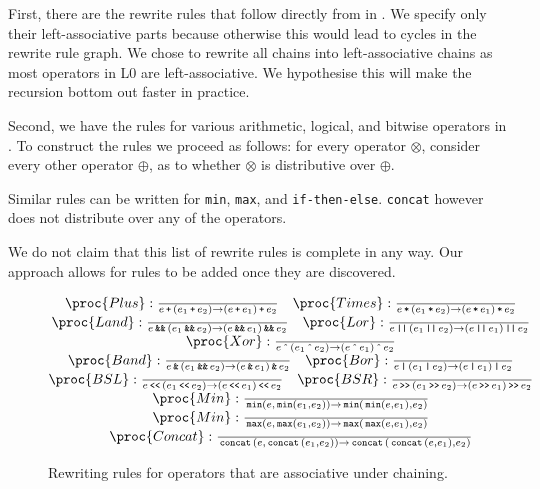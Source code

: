 First, there are the rewrite rules that follow directly from
 in . We specify
only their left-associative parts because otherwise this would lead to cycles
in the rewrite rule graph. We chose to rewrite all chains into left-associative
chains as most operators in L0 are left-associative. We hypothesise this will
make the recursion bottom out faster in practice.

Second, we have the rules for various arithmetic, logical, and bitwise
operators in . To construct the rules we proceed as
follows: for every operator $\otimes$, consider every other operator $\oplus$,
as to whether $\otimes$ is distributive over $\oplus$.

Similar rules can be written for \texttt{min}, \texttt{max}, and
\texttt{if-then-else}. \texttt{concat} however does not distribute over any of
the operators.


We do not claim that this list of rewrite rules is complete in any way. Our
approach allows for rules to be added once they are discovered.

\begin{figure*}[htbp!]
\[
\begin{matrix}
\proc{Plus}:{\over
e \lp \p{e_1 \lp e_2} \rightarrow \p{ e \lp e_1} \lp e_2
}\quad
\proc{Times}:{\over
e \lt \p{e_1\lt e_2} \rightarrow \p{e \lt e_1} \lt e_2
}\\
\proc{Land}:{\over
e \LAND \p{e_1 \LAND e_2} \rightarrow \p{ e \LAND e_1} \LAND e_2
}\quad
\proc{Lor}:{\over
e \LOR \p{e_1\LOR e_2} \rightarrow \p{e \LOR e_1} \LOR e_2
}\\
\proc{Xor}:{\over
e \LBXOR \p{e_1 \LBXOR e_2} \rightarrow \p{ e \LBXOR e_1} \LBXOR e_2
}\\
\proc{Band}:{\over
e \LBAND \p{e_1 \LAND e_2} \rightarrow \p{ e \LBAND e_1} \LBAND e_2
}\quad
\proc{Bor}:{\over
e \LBOR \p{e_1\LBOR e_2} \rightarrow \p{e \LBOR e_1} \LBOR e_2
}\\
\proc{BSL}:{\over
e \LBSL \p{e_1 \LBSL e_2} \rightarrow \p{ e \LBSL e_1} \LBSL e_2
}\quad
\proc{BSR}:{\over
e \LBSR \p{e_1\LBSR e_2} \rightarrow \p{e \LBSR e_1} \LBSR e_2
}\\
\proc{Min}:{\over
\LMIN\p{e, \LMIN\p{e_1, e_2}} \rightarrow \LMIN\p{\LMIN\p{ e, e_1}, e_2}
}\\
\proc{Min}:{\over
\LMAX\p{e, \LMAX\p{e_1, e_2}} \rightarrow \LMAX\p{\LMAX\p{ e, e_1}, e_2}
}\\
\proc{Concat}:{\over
\LCONCAT\p{e, \LCONCAT\p{e_1, e_2}} \rightarrow \LCONCAT\p{\LCONCAT\p{ e, e_1}, e_2}
}\\
\end{matrix}
\]
\caption[]{Rewriting rules for operators that are associative under chaining.}
\label{figure:rewriting-chaining}
\end{figure*}

